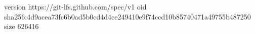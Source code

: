version https://git-lfs.github.com/spec/v1
oid sha256:4d9acea73fc6b0ad5b0cd4d4ce249410e9f74ccd10b85740471a49755b487250
size 626416
